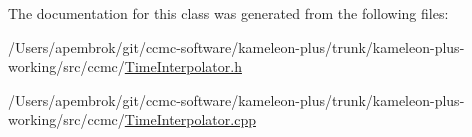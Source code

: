 The documentation for this class was generated from the following files\-:\begin{DoxyCompactItemize}
\item 
/\-Users/apembrok/git/ccmc-\/software/kameleon-\/plus/trunk/kameleon-\/plus-\/working/src/ccmc/\hyperlink{_time_interpolator_8h}{Time\-Interpolator.\-h}\item 
/\-Users/apembrok/git/ccmc-\/software/kameleon-\/plus/trunk/kameleon-\/plus-\/working/src/ccmc/\hyperlink{_time_interpolator_8cpp}{Time\-Interpolator.\-cpp}\end{DoxyCompactItemize}
